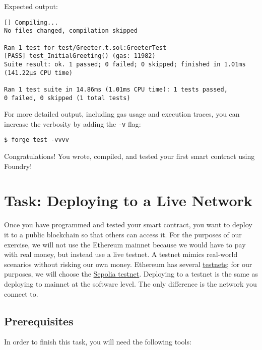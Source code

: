 \documentclass[12pt]{article}
\begin{document}
Expected output:
\begin{verbatim}
[] Compiling...
No files changed, compilation skipped

Ran 1 test for test/Greeter.t.sol:GreeterTest
[PASS] test_InitialGreeting() (gas: 11982)
Suite result: ok. 1 passed; 0 failed; 0 skipped; finished in 1.01ms 
(141.22µs CPU time)

Ran 1 test suite in 14.86ms (1.01ms CPU time): 1 tests passed, 
0 failed, 0 skipped (1 total tests)
\end{verbatim}

For more detailed output, including gas usage and execution traces, you can increase the verbosity by adding the \texttt{-v} flag:

\begin{verbatim}
$ forge test -vvvv
\end{verbatim}

Congratulations! You wrote, compiled, and tested your first smart contract using Foundry!

\section{Task: Deploying to a Live Network}

Once you have programmed and tested your smart contract, you want to deploy it to a public blockchain so that others can access it. For the purposes of our exercise, we will not use the Ethereum mainnet because we would have to pay with real money, but instead use a live testnet. A testnet mimics real-world scenarios without risking our own money. Ethereum has several \href{https://ethereum.org/en/developers/docs/networks/#ethereum-testnets}{testnets}; for our purposes, we will choose the \href{https://sepolia.dev/}{Sepolia testnet}. Deploying to a testnet is the same as deploying to mainnet at the software level. The only difference is the network you connect to.

\subsection{Prerequisites}

In order to finish this task, you will need the following tools:
\end{document}
